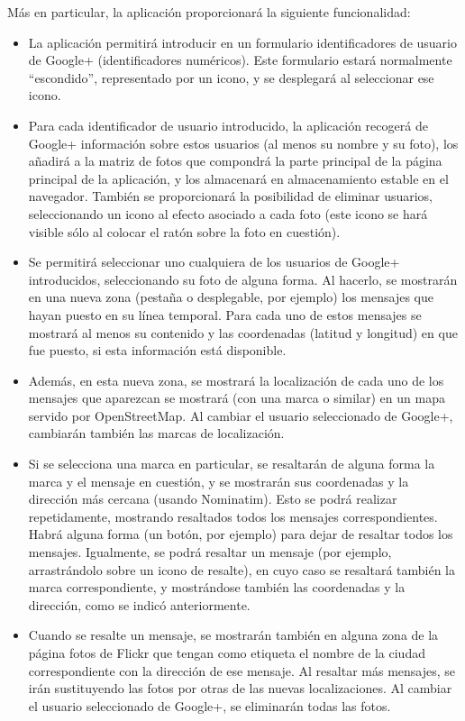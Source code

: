 Más en particular, la aplicación proporcionará la siguiente funcionalidad:

\begin{itemize}
\item La aplicación permitirá introducir en un formulario identificadores de usuario de Google+ (identificadores numéricos). Este formulario estará normalmente ``escondido'', representado por un icono, y se desplegará al seleccionar ese icono.
\item Para cada identificador de usuario introducido, la aplicación recogerá de Google+ información sobre estos usuarios (al menos su nombre y su foto), los añadirá a la matriz de fotos que compondrá la parte principal de la página principal de la aplicación, y los almacenará en almacenamiento estable en el navegador. También se proporcionará la posibilidad de eliminar usuarios, seleccionando un icono al efecto asociado a cada foto (este icono se hará visible sólo al colocar el ratón sobre la foto en cuestión).

\item Se permitirá seleccionar uno cualquiera de los usuarios de Google+ introducidos, seleccionando su foto de alguna forma. Al hacerlo, se mostrarán en una nueva zona (pestaña o desplegable, por ejemplo) los mensajes que hayan puesto en su línea temporal. Para cada uno de estos mensajes se mostrará al menos su contenido y las coordenadas (latitud y longitud) en que fue puesto, si esta información está disponible.

\item Además, en esta nueva zona, se mostrará la localización de cada uno de los mensajes que aparezcan se mostrará (con una marca o similar) en un mapa servido por OpenStreetMap. Al cambiar el usuario seleccionado de Google+, cambiarán también las marcas de localización.

\item Si se selecciona una marca en particular, se resaltarán de alguna forma la marca y el mensaje en cuestión, y se mostrarán sus coordenadas y la dirección más cercana (usando Nominatim). Esto se podrá realizar repetidamente, mostrando resaltados todos los mensajes correspondientes. Habrá alguna forma (un botón, por ejemplo) para dejar de resaltar todos los mensajes. Igualmente, se podrá resaltar un mensaje (por ejemplo, arrastrándolo sobre un icono de resalte), en cuyo caso se resaltará también la marca correspondiente, y mostrándose también las coordenadas y la dirección, como se indicó anteriormente.

\item Cuando se resalte un mensaje, se mostrarán también en alguna zona de la página fotos de Flickr que tengan como etiqueta el nombre de la ciudad correspondiente con la dirección de ese mensaje. Al resaltar más mensajes, se irán sustituyendo las fotos por otras de las nuevas localizaciones. Al cambiar el usuario seleccionado de Google+, se eliminarán todas las fotos.
\end{itemize}

